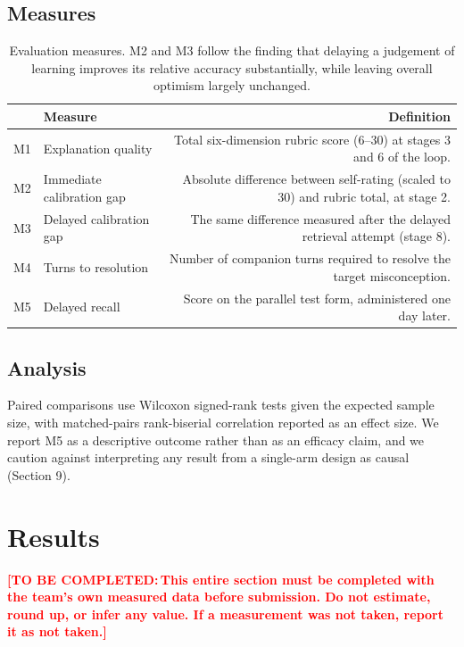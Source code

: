 \documentclass[11pt,a4paper]{article}
\newcommand{\fillin}[1]{\textcolor{red}{\textbf{[TO BE COMPLETED:\,#1]}}}
\begin{document}
\subsection{Measures}

\begin{table}[h]
\centering
\small
\begin{tabularx}{\textwidth}{@{}p{1.3cm} p{4.6cm} R@{}}
\toprule
& \textbf{Measure} & \textbf{Definition} \\
\midrule
M1 & Explanation quality & Total six-dimension rubric score (6--30) at stages 3 and 6 of the loop. \\
M2 & Immediate calibration gap & Absolute difference between self-rating (scaled to 30) and rubric total, at stage 2. \\
M3 & Delayed calibration gap & The same difference measured after the delayed retrieval attempt (stage 8). \\
M4 & Turns to resolution & Number of companion turns required to resolve the target misconception. \\
M5 & Delayed recall & Score on the parallel test form, administered one day later. \\
\bottomrule
\end{tabularx}
\caption{Evaluation measures. M2 and M3 follow the finding that delaying a judgement of
learning improves its relative accuracy substantially, while leaving overall optimism
largely unchanged.}
\label{tab:measures}
\end{table}

\subsection{Analysis}

Paired comparisons use Wilcoxon signed-rank tests given the expected sample size, with
matched-pairs rank-biserial correlation reported as an effect size. We report M5 as a
descriptive outcome rather than as an efficacy claim, and we caution against interpreting any
result from a single-arm design as causal (Section 9).

\section{Results}

\fillin{This entire section must be completed with the team's own measured data before
submission. Do not estimate, round up, or infer any value. If a measurement was not taken,
report it as not taken.}
\end{document}
